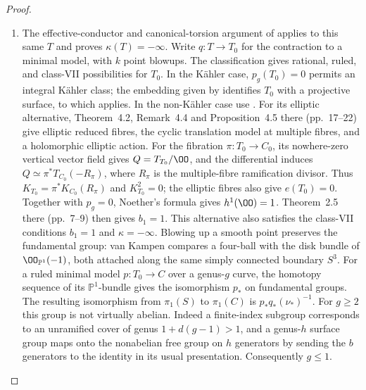 \begin{proof}
\begin{enumerate}[label=\arabic*.,leftmargin=*]
\item The effective-conductor and canonical-torsion argument of
 applies to this same $T$ and proves
$\kappa(T)=-\infty$. Write $q:T\to T_0$ for the contraction
to a minimal model, with $k$ point blowups. The classification
gives rational, ruled, and class-VII possibilities for $T_0$.
In the K\"ahler case, $p_g(T_0)=0$ permits an integral
K\"ahler class; the embedding given by
\cite[Main Theorem, pp.~314--315]{Kodaira1954} identifies $T_0$
with a projective surface, to which
\cite[Theorem~VI.17 and Corollary~VI.18, pp.~111--112]{Beauville1978}
applies. In the non-K\"ahler case use
\cite[Theorem~5.1, p.~27]{OVV2020}. For its elliptic alternative, Theorem~4.2, Remark~4.4 and
Proposition~4.5 there (pp.~17--22) give elliptic reduced fibres,
the cyclic translation model at multiple fibres, and a
holomorphic elliptic action. For the fibration
$\pi:T_0\to C_0$, its nowhere-zero vertical vector field gives
$Q=T_{T_0}/\OO$, and the differential induces
$Q\simeq\pi^*T_{C_0}(-R_\pi)$, where $R_\pi$ is the
multiple-fibre ramification divisor. Thus
$K_{T_0}=\pi^*K_{C_0}(R_\pi)$ and $K_{T_0}^2=0$;
the elliptic fibres also give $e(T_0)=0$. Together with
$p_g=0$, Noether's formula gives $h^1(\OO)=1$.
Theorem~2.5 there (pp.~7--9) then gives $b_1=1$.
This alternative also satisfies the class-VII conditions
$b_1=1$ and $\kappa=-\infty$.
Blowing up a smooth point preserves the fundamental group:
van Kampen compares a four-ball with the disk bundle
of $\OO_{\mathbb P^1}(-1)$, both attached along the same
simply connected boundary $S^3$. For a ruled minimal model
$p:T_0\to C$ over a genus-$g$ curve, the homotopy sequence
of its $\mathbb P^1$-bundle gives the isomorphism $p_*$
on fundamental groups. The resulting isomorphism from
$\pi_1(S)$ to $\pi_1(C)$ is $p_*q_*(\nu_*)^{-1}$.
For $g\ge2$ this group is not virtually abelian. Indeed a
finite-index subgroup corresponds to an unramified cover
of genus $1+d(g-1)>1$, and a genus-$h$ surface group maps
onto the nonabelian free group on $h$ generators by sending
the $b$ generators to the identity in its usual presentation.
Consequently $g\le1$.


\end{enumerate}
\end{proof}
